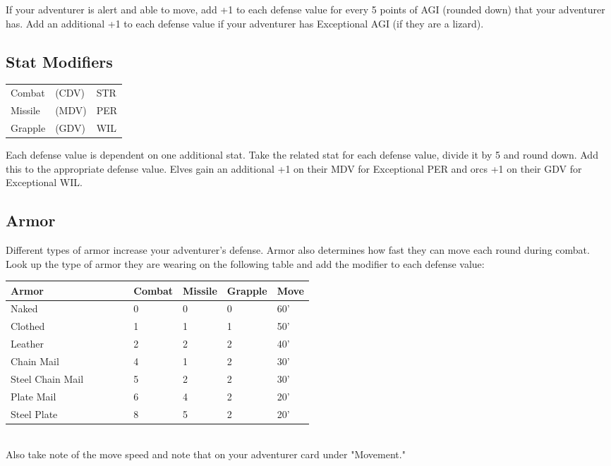 If your adventurer is alert and able to move, add +1 to each defense value for every 5 points of AGI (rounded down) that your adventurer has. Add an additional +1 to each defense value if your adventurer has Exceptional AGI (if they are a lizard).
\subsection{Stat Modifiers}


\begin{normbox}

\small
\begin{tabular}{@{}l l | l}
Combat & (CDV) & STR\\
Missile & (MDV) & PER\\
Grapple & (GDV) & WIL\\
\end{tabular}
\end{normbox}
Each defense value is dependent on one additional stat. Take the related stat for each defense value, divide it by 5 and round down. Add this to the appropriate defense value. Elves gain an additional +1 on their MDV for Exceptional PER and orcs +1 on their GDV for Exceptional WIL.
\subsection{Armor}

Different types of armor increase your adventurer's defense. Armor also determines how fast they can move each round during combat. Look up the type of armor they are wearing on the following table and add the modifier to each defense value:

\begin{normboxc}

\small
\begin{tabular}{@{}l p{0.125\linewidth} p{0.125\linewidth} p{0.125\linewidth} p{0.125\linewidth}}
\textbf{Armor} & \textbf{Combat} & \textbf{Missile} & \textbf{Grapple} & \textbf{Move}\\
\midrule
Naked & 0 & 0 & 0 & 60'\\
Clothed & 1 & 1 & 1 & 50'\\
Leather & 2 & 2 & 2 & 40'\\
Chain Mail & 4 & 1 & 2 & 30'\\
Steel Chain Mail  & 5 & 2 & 2 & 30'\\
Plate Mail & 6 & 4 & 2 & 20'\\
Steel Plate & 8 & 5 & 2 & 20'\\
\end{tabular}
\end{normboxc}\\
Also take note of the move speed and note that on your adventurer card under "Movement."
